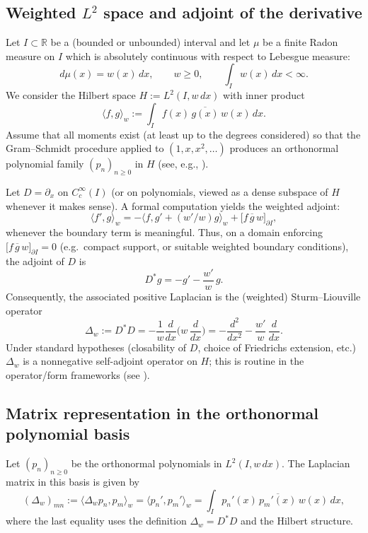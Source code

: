 \documentclass{amsart}
\numberwithin{equation}{section}
\theoremstyle{definition}
\theoremstyle{remark}
\begin{document}
\subsection{Weighted $L^2$ space and adjoint of the derivative}

Let $I\subset\mathbb R$ be a (bounded or unbounded) interval and let $\mu$ be a finite Radon measure on $I$
which is absolutely continuous with respect to Lebesgue measure:
\[
d\mu(x)=w(x)\,dx,\qquad w\ge 0,\qquad \int_I w(x)\,dx<\infty.
\]
We consider the Hilbert space $H:=L^2(I,w\,dx)$ with inner product
\[
\langle f,g\rangle_{w}:=\int_I f(x)\,\overline{g(x)}\,w(x)\,dx.
\]
Assume that all moments exist (at least up to the degrees considered) so that the Gram--Schmidt procedure
applied to $(1,x,x^2,\dots)$ produces an orthonormal polynomial family $(p_n)_{n\ge0}$ in $H$
(see, e.g., \cite{Szego,Chihara}).

Let $D=\partial_x$ on $C_c^\infty(I)$ (or on polynomials, viewed as a dense subspace of $H$ whenever it
makes sense). A formal computation yields the weighted adjoint:
\begin{equation}\label{eq:D-adjoint}
\langle f',g\rangle_w
= -\langle f, g' + (w'/w)g\rangle_w + \big[f\,\overline g\,w\big]_{\partial I},
\end{equation}
whenever the boundary term is meaningful. Thus, on a domain enforcing
\(
\big[f\,\overline g\,w\big]_{\partial I}=0
\)
(e.g.\ compact support, or suitable weighted boundary conditions), the adjoint of $D$ is
\[
D^* g = -g' - \frac{w'}{w}\,g.
\]
Consequently, the associated positive Laplacian is the (weighted) Sturm--Liouville operator
\begin{equation}\label{eq:weighted-laplacian}
\Delta_w := D^*D
= -\frac{1}{w}\frac{d}{dx}\Big(w\,\frac{d}{dx}\Big)
= -\frac{d^2}{dx^2} - \frac{w'}{w}\,\frac{d}{dx}.
\end{equation}
Under standard hypotheses (closability of $D$, choice of Friedrichs extension, etc.)
$\Delta_w$ is a nonnegative self-adjoint operator on $H$; this is routine in the operator/form frameworks
(see \cite{Kato,Ouhabaz}).

\subsection{Matrix representation in the orthonormal polynomial basis}

Let $(p_n)_{n\ge0}$ be the orthonormal polynomials in $L^2(I,w\,dx)$.
The Laplacian matrix in this basis is given by
\begin{equation}\label{eq:Delta-matrix-1d}
(\Delta_w)_{mn}
:= \langle \Delta_w p_n, p_m\rangle_w
= \langle p_n', p_m'\rangle_w
= \int_I p_n'(x)\,\overline{p_m'(x)}\,w(x)\,dx,
\end{equation}
where the last equality uses the definition $\Delta_w=D^*D$ and the Hilbert structure.
\end{document}
